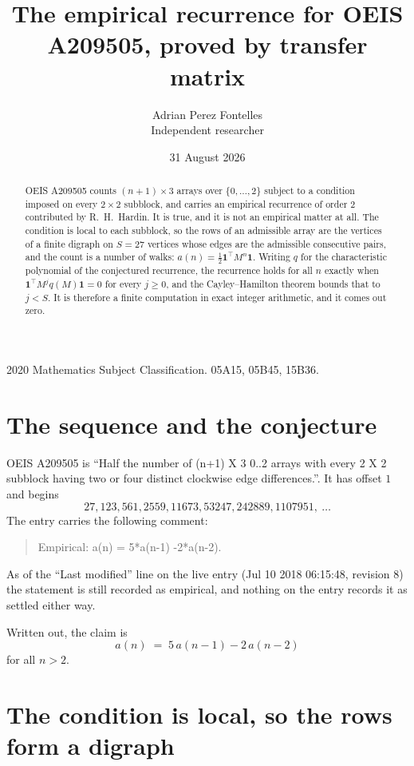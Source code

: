 \documentclass[11pt,a4paper]{article}
\title{The empirical recurrence for OEIS A209505, proved by transfer matrix}
\author{Adrian Perez Fontelles\\ \small Independent researcher}
\date{31 August 2026}
\theoremstyle{plain}
\theoremstyle{definition}
\begin{document}
\maketitle

\begin{abstract}
OEIS A209505 counts $(n+1)\times3$ arrays over $\{0,\dots,2\}$ subject to a condition imposed on
every $2\times2$ subblock, and carries an empirical recurrence of order $2$ contributed
by R.~H.~Hardin. It is true, and it is not an empirical matter at all. The condition is local
to each subblock, so the rows of an admissible array are the vertices of a finite digraph
on $S=27$ vertices whose edges are the admissible consecutive pairs, and the count is a
number of walks: $a(n)=\tfrac1{2}\mathbf{1}^{\!\top}M^{n}\mathbf{1}$. Writing $q$
for the characteristic polynomial of the conjectured recurrence, the recurrence holds for all
$n$ exactly when $\mathbf{1}^{\!\top}M^{j}q(M)\mathbf{1}=0$ for every $j\ge0$, and the
Cayley--Hamilton theorem bounds that to $j<S$. It is therefore a finite computation in exact
integer arithmetic, and it comes out zero.
\end{abstract}

\noindent\small 2020 Mathematics Subject Classification. 05A15, 05B45, 15B36.\normalsize

\section{The sequence and the conjecture}

OEIS A209505 is ``Half the number of (n+1) X 3 0..2 arrays with every 2 X 2 subblock having two or four distinct clockwise edge differences.''. It has offset $1$ and begins
\[
27, 123, 561, 2559, 11673, 53247, 242889, 1107951,\ \dots
\]
The entry carries the following comment:
\begin{quote}\small
Empirical: a(n) = 5*a(n-1) -2*a(n-2).
\end{quote}
As of the ``Last modified'' line on the live entry (Jul 10 2018 06:15:48, revision 8) the statement is
still recorded as empirical, and nothing on the entry records it as settled either way.

Written out, the claim is
\begin{equation}\label{eq:conj}
a(n)\;=\;5\,a(n-1) - 2\,a(n-2)
\end{equation}
for all $n>2$.

\section{The condition is local, so the rows form a digraph}
\end{document}
